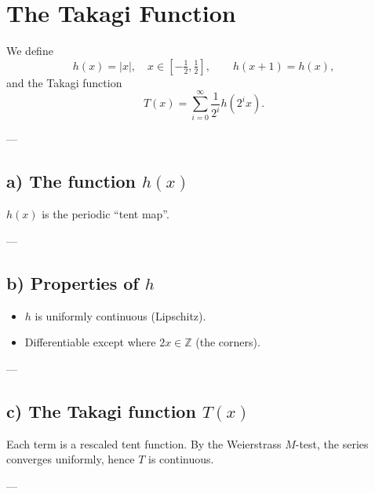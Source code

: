 \documentclass[11pt,a4paper]{article}
\begin{document}
\section*{The Takagi Function}

We define
\[
h(x) = |x|, \quad x \in \left[-\tfrac{1}{2}, \tfrac{1}{2}\right], \qquad h(x+1)=h(x),
\]
and the Takagi function
\[
T(x) = \sum_{i=0}^\infty \frac{1}{2^i} h(2^i x).
\]

---

\subsection*{a) The function $h(x)$}
$h(x)$ is the periodic ``tent map''.


---

\subsection*{b) Properties of $h$}
\begin{itemize}
	\item $h$ is uniformly continuous (Lipschitz).
	\item Differentiable except where $2x\in \mathbb{Z}$ (the corners).
\end{itemize}

---

\subsection*{c) The Takagi function $T(x)$}
Each term is a rescaled tent function. By the Weierstrass $M$-test, the series converges uniformly, hence $T$ is continuous.

---
\end{document}
